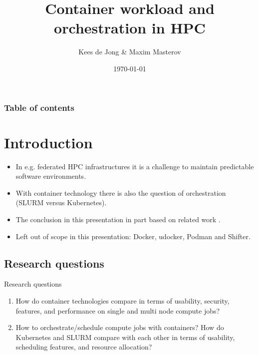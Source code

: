 \documentclass[hyperref={pdfpagelabels=false},aspectratio=169]{beamer}
\title{Container workload and orchestration in HPC}
\author{Kees de Jong \& Maxim Masterov}
\institute[SURF]{}
\date{\today}
\begin{document}
    \begin{frame}
        \titlepage
    \end{frame}


    \begin{frame}
        \frametitle{Table of contents}
        \tableofcontents
    \end{frame} 

    \section{Introduction} 
    \begin{frame}
        \begin{itemize}
          \item In e.g. federated HPC infrastructures it is a challenge to maintain predictable software environments.
          \item With container technology there is also the question of orchestration (SLURM versus Kubernetes).
          \item The conclusion in this presentation in part based on related work   .
          \item Left out of scope in this presentation: Docker, udocker, Podman and Shifter.
        \end{itemize}
    \end{frame}
    \subsection{Research questions}
    \begin{frame}
      \begin{block}{Research questions}
      \begin{enumerate}
        \item How do container technologies compare in terms of usability, security, features, and performance on single and multi node compute jobs? 
        \item How to orchestrate/schedule compute jobs with containers? How do Kubernetes and SLURM compare with each other in terms of usability, scheduling features, and resource allocation?
      \end{enumerate}
      \end{block}
    \end{frame}
\end{document}
